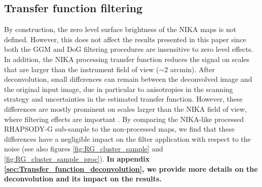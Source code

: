 \documentclass[twocolumn,traditabstract]{aa}
\begin{document}
\subsection{Transfer function filtering}\label{sec:Transfer_function_filtering}
By construction, the zero level surface brightness of the NIKA maps is not defined. However, this does not affect the results presented in this paper since both the GGM and DoG filtering procedures are insensitive to zero level effects. In addition, the NIKA processing transfer function reduces the signal on scales that are larger than the instrument field of view ($\sim 2$ arcmin). After deconvolution, small differences can remain between the deconvolved image and the original input image, due in particular to anisotropies in the scanning strategy and uncertainties in the estimated transfer function. However, these differences are mostly prominent on scales larger than the NIKA field of view, where filtering effects are important \citep{Adam2015}. By comparing the NIKA-like processed RHAPSODY-G sub-sample to the non-processed maps, we find that these differences have a negligible impact on the filter application with respect to the noise (see also figures \ref{fig:RG_cluster_sample} and \ref{fig:RG_cluster_sample_proc}). {\bf In appendix \ref{sec:Transfer_function_deconvolution}, we provide more details on the deconvolution and its impact on the results.}

\end{document}
